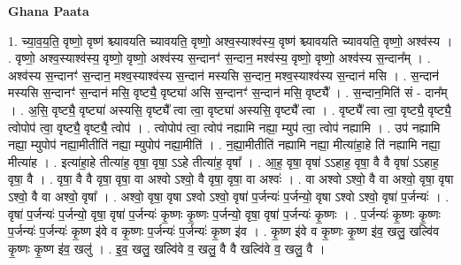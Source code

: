 \documentclass[17pt]{extarticle}
\begin{document}
\textbf{Ghana Paata } \newline

1. च्या॒व॒य॒ति॒ वृष्णो॒ वृष्ण॑ श्च्यावयति च्यावयति॒ वृष्णो॒ अश्व॒स्याश्व॑स्य॒ वृष्ण॑ श्च्यावयति च्यावयति॒ वृष्णो॒ अश्व॑स्य । . वृष्णो॒ अश्व॒स्याश्व॑स्य॒ वृष्णो॒ वृष्णो॒ अश्व॑स्य स॒न्दानꣳ॑ स॒न्दान॒ मश्व॑स्य॒ वृष्णो॒ वृष्णो॒ अश्व॑स्य स॒न्दान᳚म् । . अश्व॑स्य स॒न्दानꣳ॑ स॒न्दान॒ मश्व॒स्याश्व॑स्य स॒न्दान॑ मस्यसि स॒न्दान॒ मश्व॒स्याश्व॑स्य स॒न्दान॑ मसि । . स॒न्दान॑ मस्यसि स॒न्दानꣳ॑ स॒न्दान॑ मसि॒ वृष्ट्यै॒ वृष्ट्या॑ असि स॒न्दानꣳ॑ स॒न्दान॑ मसि॒ वृष्ट्यै᳚ । . स॒न्दान॒मिति॑ सं - दान᳚म् । . अ॒सि॒ वृष्ट्यै॒ वृष्ट्या॑ अस्यसि॒ वृष्ट्यै᳚ त्वा त्वा॒ वृष्ट्या॑ अस्यसि॒ वृष्ट्यै᳚ त्वा । . वृष्ट्यै᳚ त्वा त्वा॒ वृष्ट्यै॒ वृष्ट्यै॒ त्वोपोप॑ त्वा॒ वृष्ट्यै॒ वृष्ट्यै॒ त्वोप॑ । . त्वोपोप॑ त्वा॒ त्वोप॑ नह्यामि नह्या॒ म्युप॑ त्वा॒ त्वोप॑ नह्यामि । . उप॑ नह्यामि नह्या॒ म्युपोप॑ नह्या॒मीतीति॑ नह्या॒ म्युपोप॑ नह्या॒मीति॑ । . न॒ह्या॒मीतीति॑ नह्यामि नह्या॒ मीत्या॑हा॒हे ति॑ नह्यामि नह्या॒ मीत्या॑ह । . इत्या॑हा॒हे तीत्या॑ह॒ वृषा॒ वृषा॒ ऽऽहे तीत्या॑ह॒ वृषा᳚ । . आ॒ह॒ वृषा॒ वृषा॑ ऽऽहाह॒ वृषा॒ वै वै वृषा॑ ऽऽहाह॒ वृषा॒ वै । . वृषा॒ वै वै वृषा॒ वृषा॒ वा अश्वो ऽश्वो॒ वै वृषा॒ वृषा॒ वा अश्वः॑ । . वा अश्वो ऽश्वो॒ वै वा अश्वो॒ वृषा॒ वृषा ऽश्वो॒ वै वा अश्वो॒ वृषा᳚ । . अश्वो॒ वृषा॒ वृषा ऽश्वो ऽश्वो॒ वृषा॑ प॒र्जन्यः॑ प॒र्जन्यो॒ वृषा ऽश्वो ऽश्वो॒ वृषा॑ प॒र्जन्यः॑ । . वृषा॑ प॒र्जन्यः॑ प॒र्जन्यो॒ वृषा॒ वृषा॑ प॒र्जन्यः॑ कृ॒ष्णः कृ॒ष्णः प॒र्जन्यो॒ वृषा॒ वृषा॑ प॒र्जन्यः॑ कृ॒ष्णः । . प॒र्जन्यः॑ कृ॒ष्णः कृ॒ष्णः प॒र्जन्यः॑ प॒र्जन्यः॑ कृ॒ष्ण इ॑वे व कृ॒ष्णः प॒र्जन्यः॑ प॒र्जन्यः॑ कृ॒ष्ण इ॑व । . कृ॒ष्ण इ॑वे व कृ॒ष्णः कृ॒ष्ण इ॑व॒ खलु॒ खल्वि॑व कृ॒ष्णः कृ॒ष्ण इ॑व॒ खलु॑ । . इ॒व॒ खलु॒ खल्वि॑वे व॒ खलु॒ वै वै खल्वि॑वे व॒ खलु॒ वै । \newline
\end{document}
